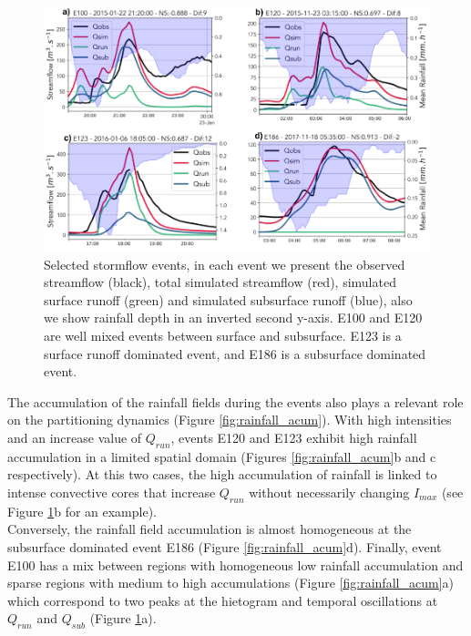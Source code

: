 \documentclass[preprint,12pt]{elsarticle}
\begin{document}
\begin{figure}[t]
    \centering
    \includegraphics[width=14cm]{Figuras/Cuatro_eventos.png}
    \caption{Selected stormflow events, in each event we present the observed streamflow (black), total simulated streamflow (red), simulated surface runoff (green) and simulated subsurface runoff (blue), also we show rainfall depth in an inverted second y-axis. E100 and E120 are well mixed events between surface and subsurface. E123 is a surface runoff dominated event, and E186 is a subsurface dominated event.}
    \label{fig:four_events}
\end{figure}

The accumulation of the rainfall fields during the events also plays a relevant role on the partitioning dynamics (Figure \ref{fig:rainfall_acum}).  With high intensities and an increase value of $Q_{run}$, events E120 and E123 exhibit high rainfall accumulation in a limited spatial domain (Figures \ref{fig:rainfall_acum}b and c respectively).  At this two cases, the high accumulation of rainfall is linked to intense convective cores that increase $Q_{run}$ without necessarily changing $I_{max}$ (see Figure \ref{fig:four_events}b for an example).\\

Conversely, the rainfall field accumulation is almost homogeneous at the subsurface dominated event E186 (Figure \ref{fig:rainfall_acum}d).   Finally, event E100 has a mix between regions with homogeneous low rainfall accumulation and sparse regions with medium to high accumulations (Figure \ref{fig:rainfall_acum}a) which correspond to two peaks at the hietogram and temporal oscillations at $Q_{run}$ and $Q_{sub}$ (Figure \ref{fig:four_events}a).\\
\end{document}
